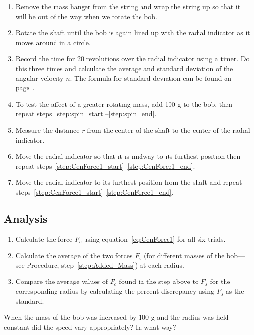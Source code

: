 \documentclass[main.tex]{subfiles}
\begin{document}
\begin{enumerate}
\item
Remove the mass hanger from the string and wrap the string up so that it will be out of the way when we rotate the bob.
\item \label{step:spin_start}
Rotate the shaft until the bob is again lined up with the radial indicator as it moves around in a circle.
\item \label{step:spin_end}
Record the time for 20 revolutions over the radial indicator using a timer. Do this three times and calculate the average and standard deviation of the angular velocity $n.$ The formula for standard deviation can be found on page~\pageref{page:stdDev}.
\item \label{step:Added_Mass}
To test the affect of a greater rotating mass, add 100 g to the bob, then repeat steps~\ref{step:spin_start}--\ref{step:spin_end}.
\item \label{step:CenForce1_end}
Measure the distance $r$ from the center of the shaft to the center of the radial indicator.
\item
Move the radial indicator so that it is midway to its furthest position then repeat steps~\ref{step:CenForce1_start}--\ref{step:CenForce1_end}.
\item
Move the radial indicator to its furthest position from the shaft and repeat steps~\ref{step:CenForce1_start}--\ref{step:CenForce1_end}.
\end{enumerate}

\subsection*{Analysis}
\begin{enumerate}
\item
Calculate the force $F_c$ using equation~\eqref{eq:CenForce1} for all six trials. 
\item
Calculate the average of the two forces $F_c$ (for different masses of the bob---see Procedure, step~\ref{step:Added_Mass}) at each radius.
\item
Compare the average values of $F_c$ found in the step above to $F_s$ for the corresponding radius by calculating the percent discrepancy using $F_s$ as the standard.
\end{enumerate}

\begin{question}
When the mass of the bob was increased by 100 g and the radius was held constant did the speed vary appropriately? In what way?
\end{question}
\end{document}
